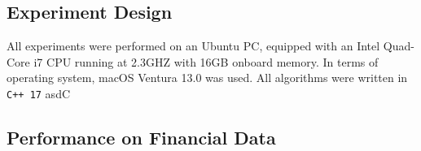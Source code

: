 \subsection{Experiment Design}
\label{sec:experiment-design}

All experiments were performed on an Ubuntu PC, equipped with an Intel Quad-Core i7 CPU running at 2.3GHZ with 16GB onboard memory. In terms of operating system, macOS Ventura 13.0 was used. All algorithms were written in \texttt{C++ 17} asdC  


\subsection{Performance on Financial Data}